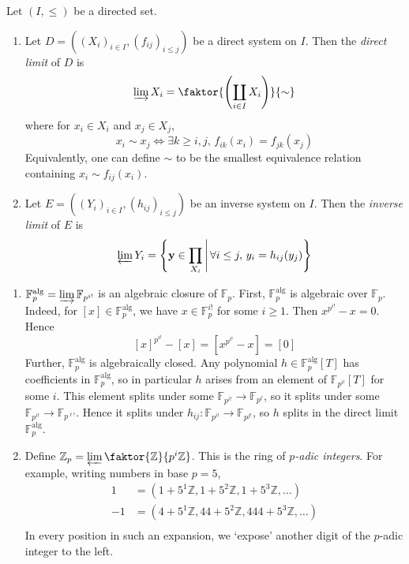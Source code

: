 \begin{definition}
    Let \( (I, \leq) \) be a directed set.
    \begin{enumerate}
        \item Let \( D = ((X_i)_{i \in I}, (f_{ij})_{i \leq j}) \) be a direct system on \( I \).
        Then the \emph{direct limit} of \( D \) is
        \[ \varinjlim X_i = \faktor{\qty(\coprod_{i \in I} X_i)}{\sim} \]
        where for \( x_i \in X_i \) and \( x_j \in X_j \),
        \[ x_i \sim x_j \iff \exists k \geq i, j,\, f_{ik} (x_i) = f_{jk} (x_j) \]
        Equivalently, one can define \( \sim \) to be the smallest equivalence relation containing \( x_i \sim f_{ij}(x_i) \).
        \item Let \( E = ((Y_i)_{i \in I}, (h_{ij})_{i \leq j}) \) be an inverse system on \( I \).
        Then the \emph{inverse limit} of \( E \) is
        \[ \varprojlim Y_i = \qty{\vb y \in \prod_{X_i} \,\middle|\,\forall i \leq j,\, y_i = h_{ij}(y_j)} \]
    \end{enumerate}
\end{definition}
\begin{example}
    \begin{enumerate}
        \item \( \mathbb F_p^{\mathrm{alg}} = \varinjlim \mathbb F_{p^{i!}} \) is an algebraic closure of \( \mathbb F_p \).
        First, \( \mathbb F_p^{\mathrm{alg}} \) is algebraic over \( \mathbb F_p \).
        Indeed, for \( [x] \in \mathbb F_p^{\mathrm{alg}} \), we have \( x \in \mathbb F_p^{i!} \) for some \( i \geq 1 \).
        Then \( x^{p^{i!}} - x = 0 \).
        Hence
        \[ [x]^{p^{i!}} - [x] = [x^{p^{i!}} - x] = [0] \]
        Further, \( \mathbb F_p^{\mathrm{alg}} \) is algebraically closed.
        Any polynomial \( h \in \mathbb F_p^{\mathrm{alg}}[T] \) has coefficients in \( \mathbb F_p^{\mathrm{alg}} \), so in particular \( h \) arises from an element of \( \mathbb F_{p^{i!}}[T] \) for some \( i \).
        This element splits under some \( \mathbb F_{p^{i!}} \to \mathbb F_{p^\ell} \), so it splits under some \( \mathbb F_{p^{i!}} \to \mathbb F_{p^{\ell!}} \).
        Hence it splits under \( h_{ij} : \mathbb F_{p^{i!}} \to \mathbb F_{p^{j!}} \), so \( h \) splits in the direct limit \( \mathbb F_p^{\mathrm{alg}} \).
        \item Define \( \mathbb Z_p = \varprojlim \faktor{\mathbb Z}{p^i \mathbb Z} \).
        This is the ring of \emph{\( p \)-adic integers}.
        For example, writing numbers in base \( p = 5 \),
        \begin{align*}
            1 &= (1 + 5^1 \mathbb Z, 1 + 5^2 \mathbb Z, 1 + 5^3 \mathbb Z, \dots) \\
            -1 &= (4 + 5^1 \mathbb Z, 44 + 5^2 \mathbb Z, 444 + 5^3 \mathbb Z, \dots) \\
        \end{align*}
        In every position in such an expansion, we `expose' another digit of the \( p \)-adic integer to the left.
    \end{enumerate}
\end{example}
